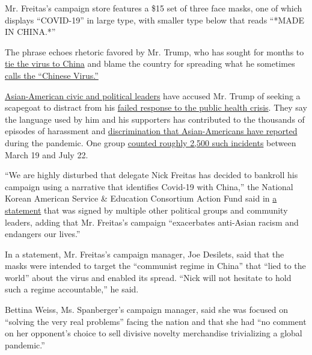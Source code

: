 Mr. Freitas's campaign store features a \$15 set of three face masks,
one of which displays ``COVID-19'' in large type, with smaller type
below that reads ``*MADE IN CHINA.*''

The phrase echoes rhetoric favored by Mr. Trump, who has sought for
months to
\href{https://www.nytimes3xbfgragh.onion/2020/05/29/health/virus-who.html}{tie
the virus to China} and blame the country for spreading what he
sometimes
\href{https://www.nytimes3xbfgragh.onion/2020/03/18/us/politics/china-virus.html}{calls
the ``Chinese Virus.''}

\href{https://www.nytimes3xbfgragh.onion/2020/03/29/us/politics/coronavirus-asian-americans.html}{Asian-American
civic and political leaders} have accused Mr. Trump of seeking a
scapegoat to distract from his
\href{https://www.nytimes3xbfgragh.onion/2020/07/18/us/politics/trump-coronavirus-response-failure-leadership.html}{failed
response to the public health crisis}. They say the language used by him
and his supporters has contributed to the thousands of episodes of
harassment and
\href{https://www.nytimes3xbfgragh.onion/2020/03/23/us/chinese-coronavirus-racist-attacks.html}{discrimination
that Asian-Americans have reported} during the pandemic. One group
\href{https://stopaapihate.org/}{counted roughly 2,500 such incidents}
between March 19 and July 22.

``We are highly disturbed that delegate Nick Freitas has decided to
bankroll his campaign using a narrative that identifies Covid-19 with
China,'' the National Korean American Service \& Education Consortium
Action Fund said in \href{https://nakasecactionfund.org/11546}{a
statement} that was signed by multiple other political groups and
community leaders, adding that Mr. Freitas's campaign ``exacerbates
anti-Asian racism and endangers our lives.''

In a statement, Mr. Freitas's campaign manager, Joe Desilets, said that
the masks were intended to target the ``communist regime in China'' that
``lied to the world'' about the virus and enabled its spread. ``Nick
will not hesitate to hold such a regime accountable,'' he said.

Bettina Weiss, Ms. Spanberger's campaign manager, said she was focused
on ``solving the very real problems'' facing the nation and that she had
``no comment on her opponent's choice to sell divisive novelty
merchandise trivializing a global pandemic.''

\hypertarget{section-12}{%
\subsection{}\label{section-12}}

